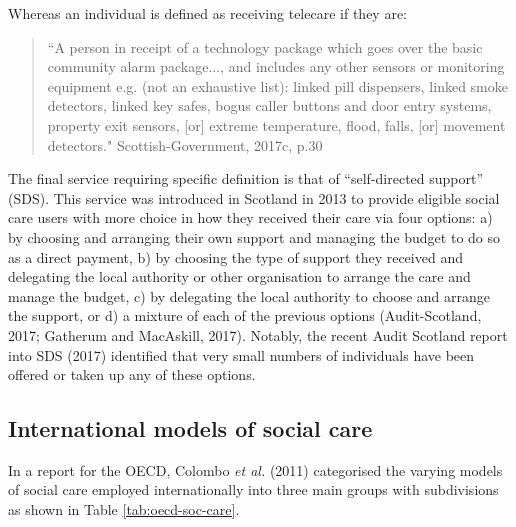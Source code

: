 \documentclass[12pt,a4paper,oneside,table]{report}
\begin{document}
Whereas an individual is defined as receiving telecare if they are:

\begin{quotation} ``A person in receipt of a technology package which goes over the basic community alarm package..., and includes any other sensors or monitoring equipment e.g. (not an exhaustive list): linked pill dispensers, linked smoke detectors, linked key safes, bogus caller buttons and door entry systems, property exit sensors, [or] extreme temperature, flood, falls, [or] movement detectors." \hfill{Scottish-Government, 2017c, p.30}\end{quotation}

The final service requiring specific definition is that of
``self-directed support'' (SDS). This service was introduced in Scotland
in 2013 to provide eligible social care users with more choice in how
they received their care via four options: a) by choosing and arranging
their own support and managing the budget to do so as a direct payment,
b) by choosing the type of support they received and delegating the
local authority or other organisation to arrange the care and manage the
budget, c) by delegating the local authority to choose and arrange the
support, or d) a mixture of each of the previous options
(Audit-Scotland, 2017; Gatherum and MacAskill, 2017). Notably, the
recent Audit Scotland report into SDS (2017) identified that very small
numbers of individuals have been offered or taken up any of these
options.

\subsection{International models of social care}\label{subsec:access-sc-models}

In a report for the OECD, Colombo \textit{et al.} (2011) categorised the
varying models of social care employed internationally into three main
groups with subdivisions as shown in Table \ref{tab:oecd-soc-care}.
\end{document}

